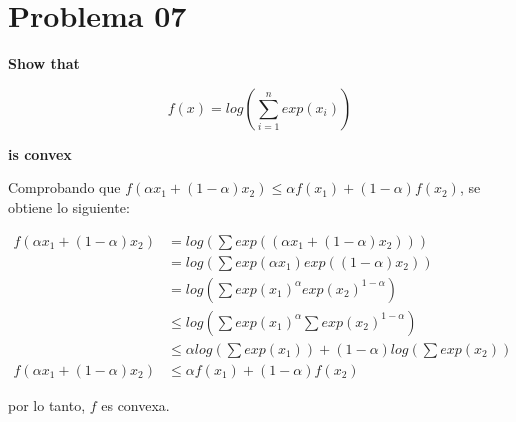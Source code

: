 \section*{Problema 07}

\textbf{Show that}

\begin{equation*}
    f(x) = log\left ( \sum_{i=1}^n exp(x_i) \right )
\end{equation*}

\textbf{is convex}


Comprobando que $f(\alpha x_1 + (1-\alpha)x_2) \leq \alpha f(x_1) + (1-\alpha)f(x_2)$, se obtiene lo siguiente:

\begin{align*}
    f(\alpha x_1 + (1-\alpha)x_2) & = log \left ( \sum exp((\alpha x_1 + (1-\alpha)x_2)) \right )                                 \\
                                  & = log \left (\sum exp(\alpha x_1) exp((1-\alpha)x_2) \right )                                 \\
                                  & = log \left (\sum exp(x_1)^\alpha exp(x_2)^{1-\alpha} \right )                                \\
                                  & \leq log \left (\sum exp(x_1)^\alpha \sum  exp(x_2)^{1-\alpha}  \right )                      \\
                                  & \leq \alpha log \left ( \sum exp(x_1) \right ) + (1-\alpha) log \left (\sum exp(x_2) \right ) \\
    f(\alpha x_1 + (1-\alpha)x_2) & \leq \alpha f(x_1) + (1-\alpha) f(x_2)
\end{align*}

por lo tanto, $f$ es convexa.